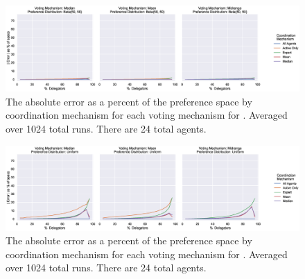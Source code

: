 \label{apx:error-by-dist-zoomed}
\begin{landscape}
    \begin{figure}[p]
        \centering
        \includegraphics[scale=0.55]
        {content/chapter2/figures/distributions/Beta_50_50_error_as_percent_of_space_abs_mean}
        \caption{
            The absolute error as a percent of the preference space by coordination
            mechanism for each voting mechanism for .
            Averaged over 1024 total runs.
            There are 24 total agents.
        }
        \label{fig:beta-50-50-error-as-percent-of-space-abs-mean}
    \end{figure}
\end{landscape}

\begin{landscape}
    \begin{figure}[p]
        \centering
        \includegraphics[scale=0.55]
        {content/chapter2/figures/distributions/Uniform_error_as_percent_of_space_abs_mean}
        \caption{
            The absolute error as a percent of the preference space by coordination
            mechanism for each voting mechanism for .
            Averaged over 1024 total runs.
            There are 24 total agents.
        }
        \label{fig:uniform-error-as-percent-of-space-abs-mean}
    \end{figure}
\end{landscape}

